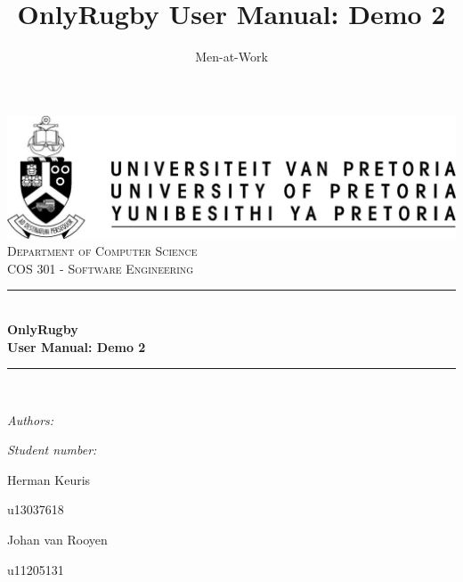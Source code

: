 \documentclass[hidelinks,a4paper,12pt]{article}
\author{Men-at-Work}
\title{ OnlyRugby User Manual: Demo 2}
\newcommand{\HRule}{\rule{\linewidth}{0.5mm}}
\begin{document}
\setlength{\parskip}{6pt}

\begin{titlepage}

\begin{center}
\includegraphics[width=1\textwidth]{./images/up-logo.jpg}\\[0.4cm]    
\textsc{\LARGE Department of Computer Science}\\[1.5cm]
\textsc{\Large COS 301 - Software Engineering}\\[0.5cm]
\HRule \\[0.4cm]
{ \huge \bfseries OnlyRugby}\\[0.4cm]
{ \huge \bfseries User Manual: Demo 2}\\[0.4cm]
\HRule \\[0.4cm]
\begin{minipage}{0.4\textwidth}
\begin{flushleft} \large
\emph{Authors:}
\end{flushleft}
\end{minipage}
\begin{minipage}{0.4\textwidth}
\begin{flushright} \large
\emph{Student number:}
\end{flushright}
\end{minipage}

\begin{minipage}{0.4\textwidth}
\begin{flushleft} \large
Herman {Keuris}
\end{flushleft}
\end{minipage}
\begin{minipage}{0.4\textwidth}
\begin{flushright} \large
\emph{}
u13037618
\end{flushright}
\end{minipage}

\begin{minipage}{0.4\textwidth}
\begin{flushleft} \large
Johan {van Rooyen}
\end{flushleft}
\end{minipage}
\begin{minipage}{0.4\textwidth}
\begin{flushright} \large
\emph{}
u11205131
\end{flushright}
\end{minipage}


\end{center}
\end{titlepage}
\end{document}

